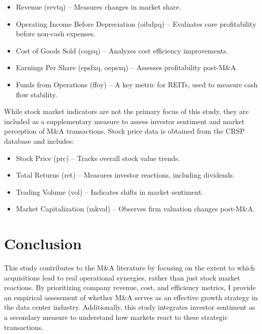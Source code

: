 \documentclass{article}
\begin{document}
\begin{itemize}
    \item Revenue (revtq) – Measures changes in market share.
    \item Operating Income Before Depreciation (oibdpq) – Evaluates core profitability before non-cash expenses.
    \item Cost of Goods Sold (cogsq) – Analyzes cost efficiency improvements.
    \item Earnings Per Share (epsfxq, oepsxq) – Assesses profitability post-M\&A.
    \item Funds from Operations (ffoy) – A key metric for REITs, used to measure cash flow stability.
\end{itemize}

While stock market indicators are not the primary focus of this study, they are included as a supplementary measure to assess investor sentiment and market perception of M\&A transactions. Stock price data is obtained from the CRSP database and includes:

\begin{itemize}
    \item Stock Price (prc) – Tracks overall stock value trends.
    \item Total Returns (ret) – Measures investor reactions, including dividends.
    \item Trading Volume (vol) – Indicates shifts in market sentiment.
    \item Market Capitalization (mkval) – Observes firm valuation changes post-M\&A.
\end{itemize}

\section{Conclusion}

This study contributes to the M\&A literature by focusing on the extent to which acquisitions lead to real operational synergies, rather than just stock market reactions. By prioritizing company revenue, cost, and efficiency metrics, I provide an empirical assessment of whether M\&A serves as an effective growth strategy in the data center industry. Additionally, this study integrates investor sentiment as a secondary measure to understand how markets react to these strategic transactions.
\end{document}
